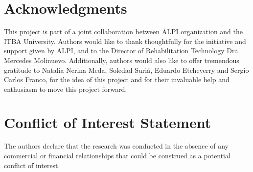 \documentclass[journal]{IEEEtran}
\begin{document}
%

\section{Acknowledgments}
This project is part of a joint collaboration between ALPI organization and the ITBA University.  Authors would like to thank thoughtfully for the initiative and support given by ALPI, and to the Director of Rehabilitation Technology Dra. Mercedes Molinuevo.  Additionally, authors would also like to offer tremendous gratitude to Natalia Nerina Meda, Soledad Suriá, Eduardo Etcheverry and Sergio Carlos Franco, for the idea of this project and for their invaluable help and enthusiasm to move this project forward.


\section*{Conflict of Interest Statement}
The authors declare that the research was conducted in the absence of any commercial or financial relationships that could be construed as a potential conflict of interest.


\ifCLASSOPTIONcaptionsoff
  \newpage
\fi




\end{document}
